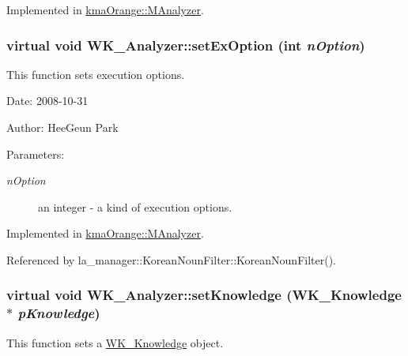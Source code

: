 Implemented in \hyperlink{classkmaOrange_1_1MAnalyzer_cfd70b959b6942cfe6deb47e082aefb6}{kmaOrange::MAnalyzer}.\hypertarget{classWK__Analyzer_679d58347c2630d002c5c57c549f9b83}{
\subsubsection[{setExOption}]{\setlength{\rightskip}{0pt plus 5cm}virtual void WK\_\-Analyzer::setExOption (int {\em nOption})}}
\label{classWK__Analyzer_679d58347c2630d002c5c57c549f9b83}


This function sets execution options. 

\begin{Desc}
\item[Date:]2008-10-31 \end{Desc}
\begin{Desc}
\item[Author:]HeeGeun Park \end{Desc}
\begin{Desc}
\item[Parameters:]
\begin{description}
\item[{\em nOption}]an integer - a kind of execution options. \end{description}
\end{Desc}


Implemented in \hyperlink{classkmaOrange_1_1MAnalyzer_397cc49de40ecf29b60d38f51654acf6}{kmaOrange::MAnalyzer}.

Referenced by la\_\-manager::KoreanNounFilter::KoreanNounFilter().\hypertarget{classWK__Analyzer_fd2f8d851743bcab677133c6a8b28d29}{
\subsubsection[{setKnowledge}]{\setlength{\rightskip}{0pt plus 5cm}virtual void WK\_\-Analyzer::setKnowledge ({\bf WK\_\-Knowledge} $\ast$ {\em pKnowledge})}}
\label{classWK__Analyzer_fd2f8d851743bcab677133c6a8b28d29}


This function sets a \hyperlink{classWK__Knowledge}{WK\_\-Knowledge} object. 

